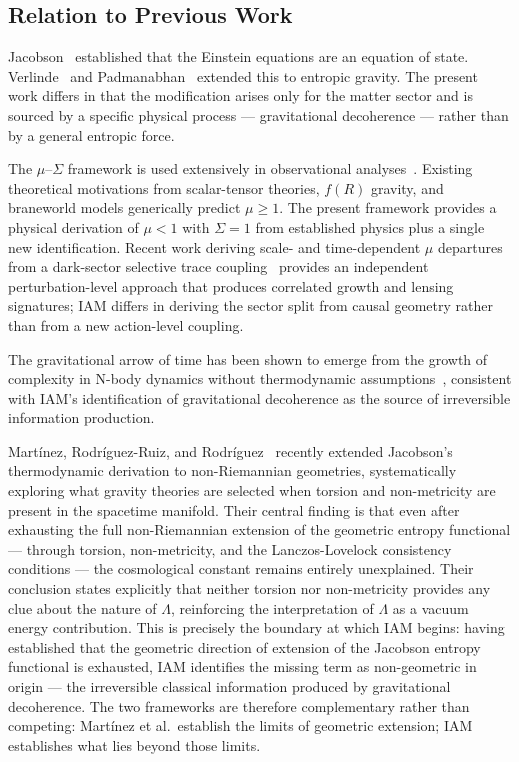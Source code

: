 \documentclass[twocolumn,a4paper,aps,prd,twocolumn,showpacs,notitlepage,superscriptaddress,nofootinbib]{article}
\begin{document}
\subsection{Relation to Previous Work}

Jacobson~\citep{Jacobson1995} established that the Einstein equations are an
equation of state.  Verlinde~\citep{Verlinde2011} and
Padmanabhan~\citep{Padmanabhan2010} extended this to entropic gravity.  The
present work differs in that the modification arises only for the matter sector
and is sourced by a specific physical process — gravitational decoherence —
rather than by a general entropic force.

The $\mu$--$\Sigma$ framework is used extensively in observational
analyses~\citep{Pogosian2016,Andrade2024,DESI2025}.  Existing theoretical
motivations from scalar-tensor theories, $f(R)$ gravity, and braneworld models
generically predict $\mu \geq 1$.  The present framework provides a physical
derivation of $\mu < 1$ with $\Sigma = 1$ from established physics plus a
single new identification.  Recent work deriving scale- and time-dependent
$\mu$ departures from a dark-sector selective trace coupling~\citep{Yildiz2026}
provides an independent perturbation-level approach that produces correlated growth
and lensing signatures; IAM differs in deriving the sector split from causal
geometry rather than from a new action-level coupling.

The gravitational arrow of time has been shown to emerge from the growth of
complexity in N-body dynamics without thermodynamic assumptions~\citep{Barbour2014},
consistent with IAM's identification of gravitational decoherence as the source
of irreversible information production.

Mart\'inez, Rodr\'iguez-Ruiz, and Rodr\'iguez~\citep{Martinez2026} recently
extended Jacobson's thermodynamic derivation to non-Riemannian geometries,
systematically exploring what gravity theories are selected when torsion and
non-metricity are present in the spacetime manifold.  Their central finding is
that even after exhausting the full non-Riemannian extension of the geometric
entropy functional — through torsion, non-metricity, and the Lanczos-Lovelock
consistency conditions — the cosmological constant remains entirely unexplained.
Their conclusion states explicitly that neither torsion nor non-metricity
provides any clue about the nature of $\Lambda$, reinforcing the interpretation
of $\Lambda$ as a vacuum energy contribution.  This is precisely the boundary
at which IAM begins: having established that the geometric direction of
extension of the Jacobson entropy functional is exhausted, IAM identifies the
missing term as non-geometric in origin — the irreversible classical information
produced by gravitational decoherence.  The two frameworks are therefore
complementary rather than competing: Mart\'inez et al.\ establish the limits of
geometric extension; IAM establishes what lies beyond those limits.
\end{document}

